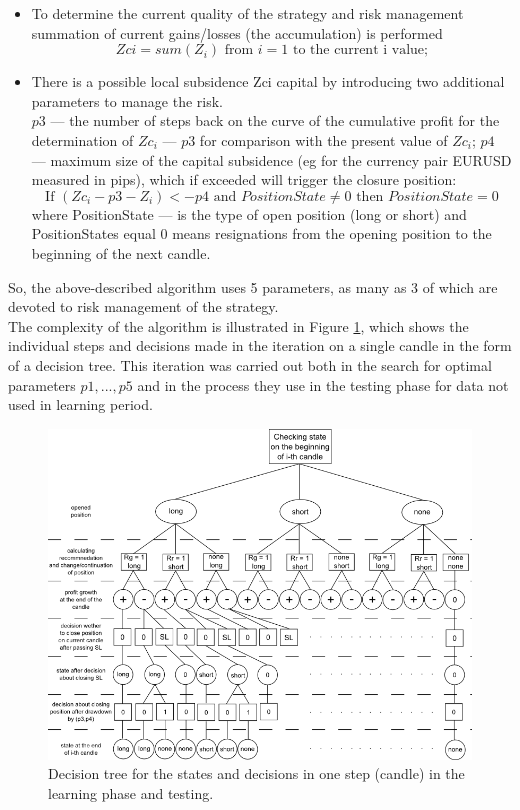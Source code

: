 \documentclass[runningheads,a4paper]{llncs}
\begin{document}
\begin{itemize}
\item To determine the current quality of the strategy and risk management summation of current gains/losses (the accumulation) is performed
\begin{equation}
Zci = sum ( Z_i ) \text{ from } i = 1 \text{ to the current i value;}
\end{equation}
\item There is a possible local subsidence Zci capital by introducing two additional parameters to manage the risk.\\
$p3$ --- the number of steps back on the curve of the cumulative profit for the determination of $Zc_i$ --- $p3$ for comparison with the present value of $Zc_i$;
$p4$ --- maximum size of the capital subsidence (eg for the currency pair EURUSD measured in pips), which if exceeded will trigger the closure position:\\
\begin{equation}
\text{If } ( Zc_i - p3 - Z_i ) <- p4 \text{ and } PositionState \neq 0 \text{ then } PositionState = 0
\end{equation} 
where PositionState --- is the type of open position (long or short) and PositionStates equal 0 means resignations from the opening position to the beginning of the next candle.
\end{itemize}
So, the above-described algorithm uses 5 parameters, as many as 3 of which are devoted to risk management of the strategy.\\
The complexity of the algorithm is illustrated in Figure \ref{fig:fig7}, which shows the individual steps and decisions made in the iteration on a single candle in the form of a decision tree. This iteration was carried out both in the search for optimal parameters $p1, ..., p5$ and in the process they use in the testing phase for data not used in learning period.\\
\begin{figure}[h!]
\centering
\includegraphics[width = \textwidth]{figures/rys7.png}
\caption{Decision tree for the states and decisions in one step (candle) in the learning phase and testing.}
\label{fig:fig7}
\end{figure}
\FloatBarrier
\end{document}
